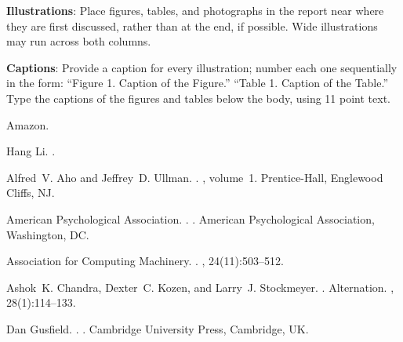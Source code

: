 \documentclass[11pt]{article}
\begin{document}
{\bf Illustrations}: Place figures, tables, and photographs in the
report near where they are first discussed, rather than at the end, if
possible.  Wide illustrations may run across both columns.

{\bf Captions}: Provide a caption for every illustration; number each one
sequentially in the form:  ``Figure 1. Caption of the Figure.'' ``Table 1.
Caption of the Table.''  Type the captions of the figures and 
tables below the body, using 11 point text.

\begin{thebibliography}{}

Amazon.

Hang Li.
.

Alfred~V. Aho and Jeffrey~D. Ullman.
.
, volume~1.
\newblock Prentice-{Hall}, Englewood Cliffs, NJ.

{American Psychological Association}.
.
.
\newblock American Psychological Association, Washington, DC.

{Association for Computing Machinery}.
.
, 24(11):503--512.

Ashok~K. Chandra, Dexter~C. Kozen, and Larry~J. Stockmeyer.
.
\newblock Alternation.
,
  28(1):114--133.

Dan Gusfield.
.
.
\newblock Cambridge University Press, Cambridge, UK.

\end{thebibliography}
\end{document}
